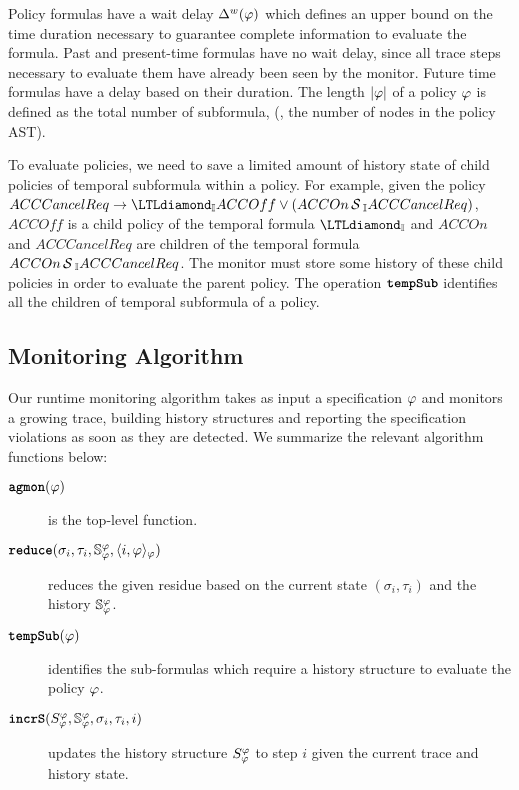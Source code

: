 Policy formulas have a wait delay $\wdelay(\policy)$ which defines an upper bound on the time duration necessary to guarantee complete information to evaluate the formula. Past and present-time formulas have no wait delay, since all trace steps necessary to evaluate them have already been seen by the monitor. Future time formulas have a delay based on their duration. The length $|\policy|$ of a policy $\policy$ is defined as the total number of subformula, (\ie, the number of nodes in the policy AST).

To evaluate \planguage policies, we need to save a limited amount of history state of child policies of temporal subformula within a policy. For example, given the policy $ACCCancelReq \rightarrow \eventually_{\interval} ACCOff \vee (ACCOn \since_{\interval} ACCCancelReq)$, $ACCOff$ is a child policy of the temporal formula $\eventually_{\interval}$ and $ACCOn$ and $ACCCancelReq$ are children of the temporal formula $ACCOn \since_{\interval} ACCCancelReq$. The monitor must store some history of these child policies in order to evaluate the parent policy.
The operation $\tempSub$ identifies all the children of temporal subformula of a policy.




\subsection{Monitoring Algorithm}
Our runtime monitoring algorithm \monitor takes as input a specification $\policy$ and monitors a growing trace, building history structures and reporting the specification violations as soon as they are detected. We summarize the relevant algorithm functions below:

\begin{description}
\item[$\monitor{}(\policy)$] is the top-level function. \\
\item[$\reduce(\sigma_i, \tau_i, \histSt{i}, \rpt{i}{\policy}{\policy})$] reduces the given residue based on the current state $(\sigma_i,\tau_i)$ and the history $\histSt{i}$.
\item[$\tempSub(\policy)$] identifies the sub-formulas which require a history structure to evaluate the policy $\policy$.
\item[$\incrS(\histst{i-1}, \histSt{i}, \sigma_i, \tau_i, i)$] updates the history structure $\histst{i-1}$ to step $i$ given the current trace and history state.
\end{description}




